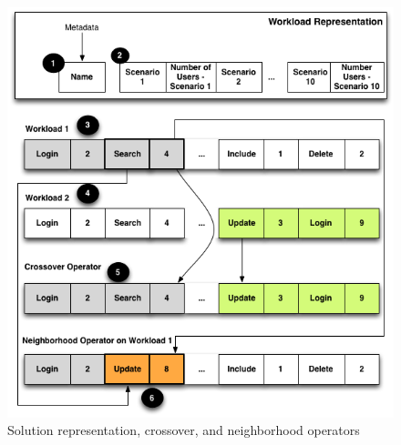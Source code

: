 \documentclass{bmcart}
\begin{document}
\begin{backmatter}
\begin{figure}[h]
\centering
\includegraphics{./images/genomere.png}
\caption{Solution representation, crossover,  and neighborhood operators \citep{Gois2016}}
\label{fig:solution}
\end{figure}


\end{backmatter}
\end{document}
